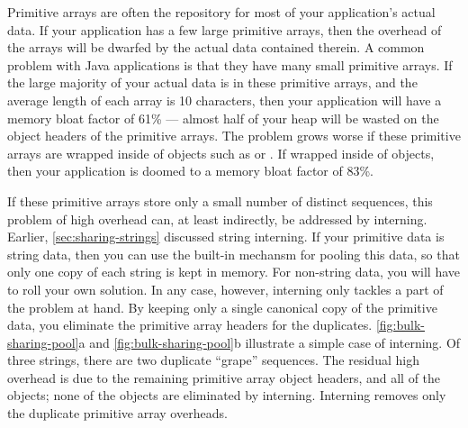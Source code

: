 Primitive arrays are often the repository for most of your application's actual
data. If your application has a few large primitive arrays, then the overhead of
the arrays will be dwarfed by the actual data contained therein. A common problem
with Java applications is that they have many small primitive arrays.
 If the large majority of your actual data is in
these primitive arrays, and the average length of each array is 10 characters,
then your application will have a memory bloat factor of 61\%
--- almost half of your heap will be wasted on the object headers of the
primitive arrays. The problem grows worse if these primitive arrays are wrapped
inside of objects such as  or . If
wrapped inside of  objects, then your application is doomed to a
memory bloat factor of 83\%.

If these primitive arrays store only a small number of distinct sequences, this
problem of high overhead can, at least indirectly, be addressed by
interning. Earlier, \autoref{sec:sharing-strings} discussed
string interning. If your primitive data is string data, then you can use the
\jres built-in mechansm for pooling this data, so that only one copy of each
string is kept in memory. For non-string data, you will have to roll your own
solution. In any case, however, interning only tackles a part of the problem at
hand. By keeping only a single canonical copy of the primitive data, you
eliminate the primitive array headers for the duplicates.
\autoref{fig:bulk-sharing-pool}a and \autoref{fig:bulk-sharing-pool}b illustrate
a simple case of interning. Of three strings, there are two duplicate ``grape''
sequences. The residual high overhead is due to the remaining primitive array
object headers, and all of the  objects; none of the 
objects are eliminated by interning. Interning removes only the duplicate
primitive array overheads.


